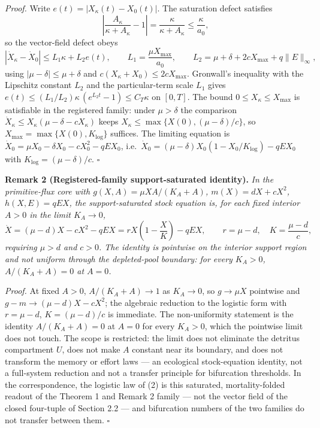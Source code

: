 \documentclass[11pt]{article}
\begin{document}
\emph{Proof.} Write \(e(t) = |X_\kappa(t) - X_0(t)|\). The saturation
defect satisfies
\[\left| \frac{A_\kappa}{\kappa + A_\kappa} - 1 \right| = \frac{\kappa}{\kappa + A_\kappa} \le \frac{\kappa}{a_0},\]
so the vector-field defect obeys
\[|\dot X_\kappa - \dot X_0| \le L_1 \kappa + L_2 e(t), \qquad L_1 = \frac{\mu X_{\max}}{a_0}, \qquad L_2 = \mu + \delta + 2cX_{\max} + q\|E\|_\infty,\]
using \(|\mu - \delta| \le \mu + \delta\) and
\(c(X_\kappa + X_0) \le 2cX_{\max}\). Gronwall's inequality with the
Lipschitz constant \(L_2\) and the particular-term scale \(L_1\) gives
\(e(t) \le (L_1/L_2)\kappa\,(e^{L_2 t} - 1) \le C_T \kappa\) on
\([0,T]\). The bound \(0 \le X_\kappa \le X_{\max}\) is satisfiable in
the registered family: under \(\mu > \delta\) the comparison
\(\dot X_\kappa \le X_\kappa(\mu - \delta - cX_\kappa)\) keeps
\(X_\kappa \le \max\{X(0), (\mu-\delta)/c\}\), so
\(X_{\max} = \max\{X(0), K_{\log}\}\) suffices. The limiting equation is
\(\dot X_0 = \mu X_0 - \delta X_0 - cX_0^2 - qE X_0\),
i.e.~\(\dot X_0 = (\mu - \delta)X_0 (1 - X_0/K_{\log}) - qE X_0\) with
\(K_{\log} = (\mu - \delta)/c\). \ensuremath{\square}

\textbf{Remark 2 (Registered-family support-saturated identity).}
\emph{In the primitive-flux core with \(g(X,A) = \mu XA/(K_A + A)\),
\(m(X) = dX + cX^2\), \(h(X,E) = qEX\), the support-saturated stock
equation is, for each fixed interior \(A > 0\) in the limit
\(K_A \to 0\),}
\[\dot X = (\mu - d)X - cX^2 - qEX = rX\left(1 - \frac{X}{K}\right) - qEX, \qquad r = \mu - d, \quad K = \frac{\mu - d}{c},\]
\emph{requiring \(\mu > d\) and \(c > 0\). The identity is pointwise on
the interior support region and not uniform through the depleted-pool
boundary: for every \(K_A > 0\), \(A/(K_A + A) = 0\) at \(A = 0\).}

\emph{Proof.} At fixed \(A > 0\), \(A/(K_A + A) \to 1\) as
\(K_A \to 0\), so \(g \to \mu X\) pointwise and
\(g - m \to (\mu - d)X - cX^2\); the algebraic reduction to the logistic
form with \(r = \mu - d\), \(K = (\mu - d)/c\) is immediate. The
non-uniformity statement is the identity \(A/(K_A + A) = 0\) at
\(A = 0\) for every \(K_A > 0\), which the pointwise limit does not
touch. The scope is restricted: the limit does not eliminate the
detritus compartment \(U\), does not make \(A\) constant near its
boundary, and does not transform the memory or effort laws --- an
ecological stock-equation identity, not a full-system reduction and not
a transfer principle for bifurcation thresholds. In the correspondence,
the logistic law of (2) is this saturated, mortality-folded readout of
the Theorem 1 and Remark 2 family --- not the vector field of the closed
four-tuple of Section 2.2 --- and bifurcation numbers of the two
families do not transfer between them. \ensuremath{\square}
\end{document}
